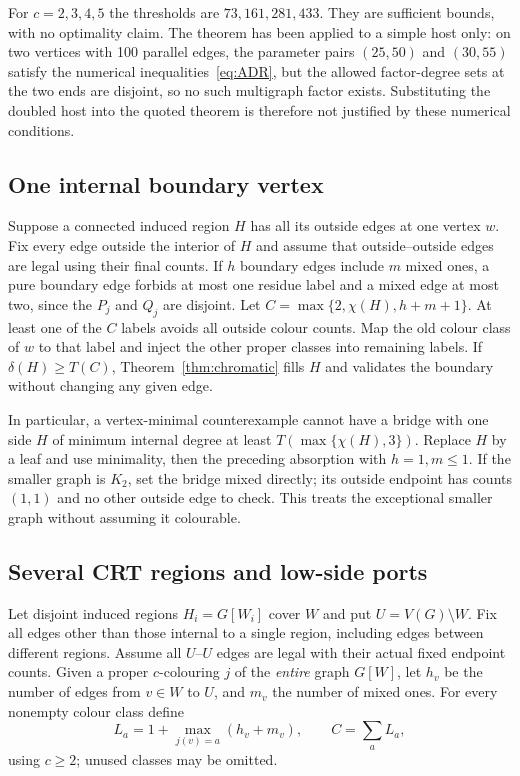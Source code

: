 For $c=2,3,4,5$ the thresholds are $73,161,281,433$. They are
sufficient bounds, with no optimality claim. The theorem has been
applied to a simple host only: on two vertices with 100 parallel
edges, the parameter pairs $(25,50)$ and $(30,55)$ satisfy the
numerical inequalities~\eqref{eq:ADR}, but the allowed factor-degree
sets at the two ends are disjoint, so no such multigraph factor
exists. Substituting the doubled host into the quoted theorem is
therefore not justified by these numerical conditions.

\subsection{One internal boundary vertex}

Suppose a connected induced region $H$ has all its outside edges
at one vertex $w$. Fix every edge outside the interior of $H$ and
assume that outside--outside edges are legal using their final counts.
If $h$ boundary edges include $m$ mixed ones, a pure boundary edge
forbids at most one residue label and a mixed edge at most two,
since the $P_j$ and $Q_j$ are disjoint. Let
$C=\max\{2,\chi(H),h+m+1\}$. At least one of the $C$ labels
avoids all outside colour counts. Map the old colour class of $w$
to that label and inject the other proper classes into remaining
labels. If $\delta(H)\ge T(C)$, Theorem~\ref{thm:chromatic} fills
$H$ and validates the boundary without changing any given edge.

In particular, a vertex-minimal counterexample cannot have a bridge
with one side $H$ of minimum internal degree at least
$T(\max\{\chi(H),3\})$. Replace $H$ by a leaf and use minimality,
then the preceding absorption with $h=1,m\le1$. If the smaller
graph is $K_2$, set the bridge mixed directly; its outside endpoint
has counts $(1,1)$ and no other outside edge to check. This treats
the exceptional smaller graph without assuming it colourable.

\subsection{Several CRT regions and low-side ports}\label{sec:crtregions}

Let disjoint induced regions $H_i=G[W_i]$ cover $W$ and put
$U=V(G)\setminus W$. Fix all edges other than those internal to
a single region, including edges between different regions. Assume
all $U$--$U$ edges are legal with their actual fixed endpoint counts.
Given a proper $c$-colouring $j$ of the \emph{entire} graph $G[W]$,
let $h_v$ be the number of edges from $v\in W$ to $U$, and $m_v$
the number of mixed ones. For every nonempty colour class define
\[
 L_a=1+\max_{j(v)=a}(h_v+m_v),\qquad C=\sum_a L_a,
\]
using $c\ge2$; unused classes may be omitted.

